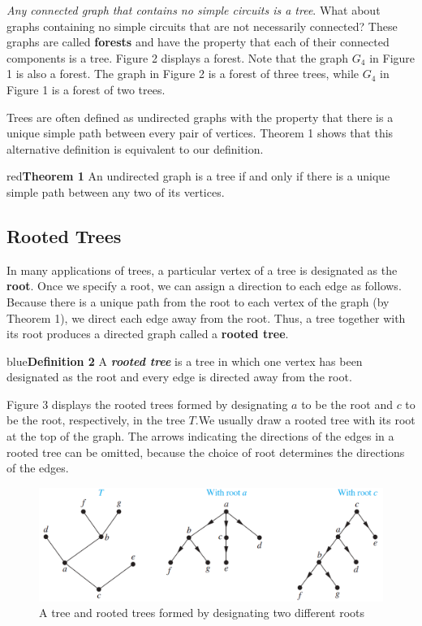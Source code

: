 \documentclass{article}
\begin{document}
\textit{Any connected graph that contains no simple circuits is a tree}. What about graphs containing no simple circuits that are not necessarily connected? These graphs are called \textbf{forests} and have the property that each of their connected components is a tree. Figure 2 displays a forest. Note that the graph $G_4$ in Figure 1 is also a forest. The graph in Figure 2 is a forest of three trees, while $G_4$ in Figure 1 is a forest of two trees.

Trees are often defined as undirected graphs with the property that there is a unique simple path between every pair of vertices. Theorem 1 shows that this alternative definition is equivalent to our definition.

\begin{mybox}{red}{\textbf{Theorem 1}}
An undirected graph is a tree if and only if there is a unique simple path between any two of its vertices.
\end{mybox}

\subsection{Rooted Trees}

In many applications of trees, a particular vertex of a tree is designated as the \textbf{root}. Once we specify a root, we can assign a direction to each edge as follows. Because there is a unique path from the root to each vertex of the graph (by Theorem 1), we direct each edge away from the root. Thus, a tree together with its root produces a directed graph called a \textbf{rooted tree}.

\begin{mybox}{blue}{\textbf{Definition 2}}
A \textit{\textbf{rooted tree}} is a tree in which one vertex has been designated as the root and every edge is directed away from the root.
\end{mybox}

Figure 3 displays the rooted trees formed by designating $a$ to be the root and $c$ to be the root, respectively, in the tree $T$.We usually draw a rooted tree with its root at the top of the graph. The arrows indicating the directions of the edges in a rooted tree can be omitted, because the choice of root determines the directions of the edges.

\begin{figure}[h!]
    \centering
    \includegraphics[width=.6\textwidth]{img/ch11-figure4.png}
    \caption{A tree and rooted trees formed by designating two different roots}
    \label{fig:my_label}
\end{figure}
\end{document}
